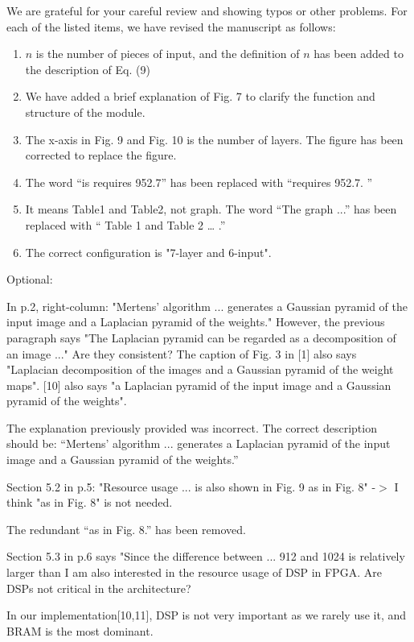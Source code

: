 \documentclass[a4j]{jsarticle}
\begin{document}
\noindent
We are grateful for your careful review and showing typos or
other problems. For each of the listed items, we have revised
the manuscript as follows:
\begin{enumerate}
  \item $\mathit{n}$ is the number of pieces of input, and the definition of $\mathit{n}$ has been added to the description of Eq. (9)
  \item We have added a brief explanation of Fig. 7 to clarify the function and structure of the module.
  \item The x-axis in Fig. 9 and Fig. 10 is the number of layers. The figure has been corrected to replace the figure.
  \item The word “is requires 952.7” has been replaced with “requires 952.7. ”  
  \item It means Table1 and Table2, not graph. The word “The graph ...” has been replaced with “ Table 1 and Table 2 … .” 
  \item The correct configuration is "7-layer and 6-input".
\end{enumerate}

\begin{screen}
Optional:

In p.2, right-column: "Mertens' algorithm ... generates a Gaussian pyramid of the input image and a Laplacian pyramid of the weights."
However, the previous paragraph says "The Laplacian pyramid can be regarded as a decomposition of an image ..."
Are they consistent?
The caption of Fig. 3 in [1] also says "Laplacian decomposition of the images and a Gaussian pyramid of the weight maps".
[10] also says "a Laplacian pyramid of the input image and a Gaussian pyramid of the weights".
\end{screen}
The explanation previously provided was incorrect. The correct description should be: “Mertens' algorithm ... generates a Laplacian pyramid of the input image and a Gaussian pyramid of the weights.”

\vspace{0.3cm}
\begin{screen}
Section 5.2 in p.5: "Resource usage ... is also shown in Fig. 9 as in Fig. 8"
-$>$ I think "as in Fig. 8" is not needed.
\end{screen}
The redundant “as in Fig. 8.” has been removed.

\vspace{0.3cm}
\begin{screen}
Section 5.3 in p.6 says "Since the difference between ... 912 and 1024 is relatively larger than
I am also interested in the resource usage of DSP in FPGA. Are DSPs not critical in the architecture?
\end{screen}
In our implementation[10,11], DSP is not very important as we rarely use it, and BRAM is the most dominant.
\end{document}
